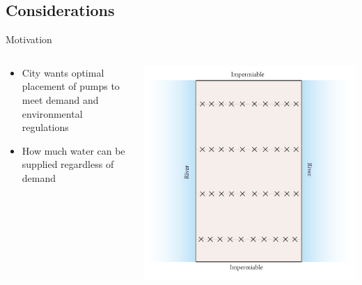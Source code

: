 \documentclass[xcolor=x11names,compress]{beamer}
\renewcommand{\(}{\begin{columns}}
\renewcommand{\)}{\end{columns}}
\newcommand{\<}[1]{\begin{column}{#1}}
\renewcommand{\>}{\end{column}}
\begin{document}
\subsection{Considerations}
\begin{frame}{Motivation}
\begin{columns}
\begin{column}{.5\textwidth}
\begin{itemize}
\item City wants optimal placement of pumps to meet demand and environmental regulations 
\item How much water can be supplied regardless of demand
\end{itemize} 
\end{column}
\begin{column}{.5\textwidth}
\includegraphics[width=\textwidth]{site.pdf} 
\end{column}
\end{columns}

\end{frame}

\end{document}
